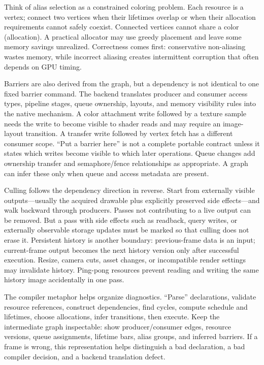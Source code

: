 Think of alias selection as a constrained coloring problem. Each resource is a vertex; connect two vertices when their lifetimes overlap or when their allocation requirements cannot safely coexist. Connected vertices cannot share a color (allocation). A practical allocator may use greedy placement and leave some memory savings unrealized. Correctness comes first: conservative non-aliasing wastes memory, while incorrect aliasing creates intermittent corruption that often depends on GPU timing.

Barriers are also derived from the graph, but a dependency is not identical to one fixed barrier command. The backend translates producer and consumer access types, pipeline stages, queue ownership, layouts, and memory visibility rules into the native mechanism. A color attachment write followed by a texture sample needs the write to become visible to shader reads and may require an image-layout transition. A transfer write followed by vertex fetch has a different consumer scope. ``Put a barrier here'' is not a complete portable contract unless it states which writes become visible to which later operations. Queue changes add ownership transfer and semaphore/fence relationships as appropriate. A graph can infer these only when queue and access metadata are present.

Culling follows the dependency direction in reverse. Start from externally visible outputs---usually the acquired drawable plus explicitly preserved side effects---and walk backward through producers. Passes not contributing to a live output can be removed. But a pass with side effects such as readback, query writes, or externally observable storage updates must be marked so that culling does not erase it. Persistent history is another boundary: previous-frame data is an input; current-frame output becomes the next history version only after successful execution. Resize, camera cuts, asset changes, or incompatible render settings may invalidate history. Ping-pong resources prevent reading and writing the same history image accidentally in one pass.

The compiler metaphor helps organize diagnostics. ``Parse'' declarations, validate resource references, construct dependencies, find cycles, compute schedule and lifetimes, choose allocations, infer transitions, then execute. Keep the intermediate graph inspectable: show producer/consumer edges, resource versions, queue assignments, lifetime bars, alias groups, and inferred barriers. If a frame is wrong, this representation helps distinguish a bad declaration, a bad compiler decision, and a backend translation defect.


